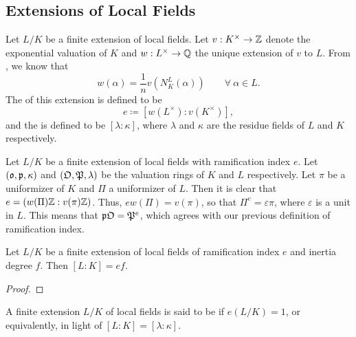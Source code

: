 \subsection{Extensions of Local Fields}

\begin{definition}
    Let $L/K$ be a finite extension of local fields. Let $v: K^\times\to\mathbb{Z}$ denote the exponential valuation of $K$ and $w: L^\times\to\mathbb{Q}$ the unique extension of $v$ to $L$. From , we know that 
    \begin{equation*}
        w(\alpha) = \frac{1}{n}v\left(N^L_K(\alpha)\right)\qquad\forall~\alpha\in L.
    \end{equation*}
    The  of this extension is defined to be
    \begin{equation*}
        e\coloneq \left[w\left(L^\times\right) : v\left(K^\times\right)\right],
    \end{equation*}
    and the  is defined to be $[\lambda : \kappa]$, where $\lambda$ and $\kappa$ are the residue fields of $L$ and $K$ respectively.
\end{definition}

\begin{remark}
    Let $L/K$ be a finite extension of local fields with ramification index $e$. Let $(\mathfrak{o},\mathfrak{p},\kappa)$ and $(\mathfrak{O},\mathfrak{P},\lambda)$ be the valuation rings of $K$ and $L$ respectively. Let $\pi$ be a uniformizer of $K$ and $\Pi$ a uniformizer of $L$. Then it is clear that $e = \left(w(\Pi)\mathbb{Z} : v(\pi)\mathbb{Z}\right)$. Thus, $ew(\Pi) = v(\pi)$, so that $\Pi^e = \varepsilon \pi$, where $\varepsilon$ is a unit in $L$. This means that $\mathfrak{p}\mathfrak{O} = \mathfrak{P}^e$, which agrees with our previous definition of ramification index.
\end{remark}

\begin{proposition}
    Let $L/K$ be a finite extension of local fields of ramification index $e$ and inertia degree $f$. Then $[L : K] = ef$.
\end{proposition}
\begin{proof}
\end{proof}

\begin{definition}
    A finite extension $L/K$ of local fields is said to be  if $e(L/K) = 1$, or equivalently, in light of   $[L : K] = [\lambda :\kappa]$.
\end{definition}

\begin{theorem}
\end{theorem}